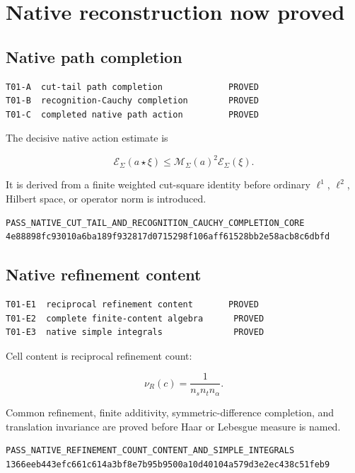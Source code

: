 \hypertarget{native-reconstruction-now-proved}{%
\section{Native reconstruction now proved}\label{native-reconstruction-now-proved}}

\hypertarget{native-path-completion}{%
\subsection{Native path completion}\label{native-path-completion}}

\begin{verbatim}
T01-A  cut-tail path completion             PROVED
T01-B  recognition-Cauchy completion        PROVED
T01-C  completed native path action         PROVED
\end{verbatim}

The decisive native action estimate is

\[
\mathcal E_\Sigma(a\star\xi)
\le
\mathcal M_\Sigma(a)^2\mathcal E_\Sigma(\xi).
\]

It is derived from a finite weighted cut-square identity before ordinary
\(\ell^1\), \(\ell^2\), Hilbert space, or operator norm is introduced.

\begin{verbatim}
PASS_NATIVE_CUT_TAIL_AND_RECOGNITION_CAUCHY_COMPLETION_CORE
4e88898fc93010a6ba189f932817d0715298f106aff61528bb2e58acb8c6dbfd
\end{verbatim}

\hypertarget{native-refinement-content}{%
\subsection{Native refinement content}\label{native-refinement-content}}

\begin{verbatim}
T01-E1  reciprocal refinement content       PROVED
T01-E2  complete finite-content algebra      PROVED
T01-E3  native simple integrals              PROVED
\end{verbatim}

Cell content is reciprocal refinement count:

\[
\nu_R(c)=\frac1{n_sn_tn_\alpha}.
\]

Common refinement, finite additivity, symmetric-difference completion, and
translation invariance are proved before Haar or Lebesgue measure is named.

\begin{verbatim}
PASS_NATIVE_REFINEMENT_COUNT_CONTENT_AND_SIMPLE_INTEGRALS
1366eeb443efc661c614a3bf8e7b95b9500a10d40104a579d3e2ec438c51feb9
\end{verbatim}

